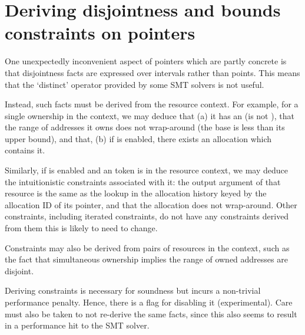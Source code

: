 \section{Deriving disjointness and bounds constraints on pointers}

One unexpectedly inconvenient aspect of pointers which are partly concrete is
that disjointness facts are expressed over intervals rather than points. This
means that the `distinct' operator provided by some SMT solvers is not
useful.

Instead, such facts must be derived from the resource context. For
example, for a single ownership in the context, we may deduce that (a) it has
an  (is not ), that the range of addresses it
owns does not wrap-around (the base is less than its upper bound), and that, (b) if
 is enabled, there exists an allocation which contains it.


Similarly, if  is enabled and an  token is in the
resource context, we may deduce the intuitionistic constraints associated with
it: the output argument of that resource is the same as the lookup in the
 allocation history keyed by the allocation ID of its pointer,
and that the allocation does not wrap-around. Other constraints, including iterated
constraints, do not have any constraints derived from them \textemdash{} this is
likely to need to
change.


Constraints may also be derived from pairs of resources in the context, such as
the fact that simultaneous ownership implies the range of owned addresses are
disjoint.


Deriving constraints is necessary for soundness but incurs a non-trivial
performance penalty. Hence, there is a flag for disabling it (experimental).
Care must also be taken to not re-derive the same facts, since this also seems
to result in a performance hit to the SMT
solver.

